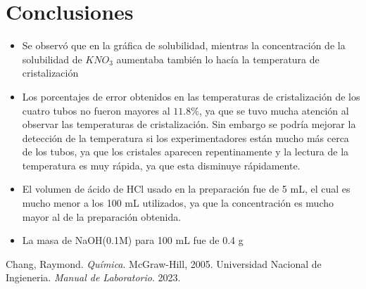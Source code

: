 \documentclass[11pt]{scrartcl}
\begin{document}
\section{Conclusiones}
\begin{itemize}
	\item  Se observó que en la gráfica de solubilidad, mientras la concentración de la solubilidad de $KNO_3$ aumentaba también lo hacía la temperatura de cristalización
	\item  Los porcentajes de error obtenidos en las temperaturas de cristalización de los cuatro tubos no fueron mayores al $11.8\%$, ya que se tuvo mucha atención al observar las temperaturas de cristalización. Sin embargo se podría mejorar la detección de la temperatura si los experimentadores están mucho más cerca de los tubos, ya que los cristales aparecen repentinamente y la lectura de la temperatura es muy rápida, ya que esta disminuye rápidamente.
	\item  El volumen de ácido de HCl usado en la preparación fue de 5 mL, el cual es mucho menor a los 100 mL utilizados, ya que la concentración es mucho mayor al de la preparación obtenida.
	\item  La masa de NaOH(0.1M) para 100 mL fue de 0.4 g
\end{itemize}	
\begin{thebibliography}{99}

Chang, Raymond.
\textit{Química}.
McGraw-Hill, 2005.
Universidad Nacional de Ingieneria.
\textit{Manual de Laboratorio}.
2023.

\end{thebibliography}
\end{document}
